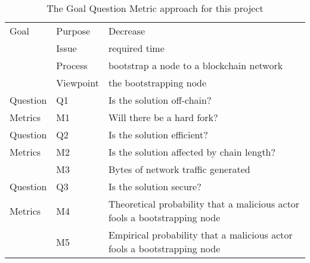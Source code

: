 \begin{center}
\begin{table}[h]
    \begin{tabular}{|ll|l|}
        \hline
        Goal & Purpose    & Decrease \\
             & Issue      & required time \\
             & Process    & bootstrap a node to a blockchain network \\
             & Viewpoint  & the bootstrapping node \\ \hline

        Question & Q1 & Is the solution off-chain? \\ \hline
        Metrics  & M1 & Will there be a hard fork? \\ \hline

        Question & Q2 & Is the solution efficient? \\ \hline
        Metrics  & M2 & Is the solution affected by chain length? \\
                 & M3 & Bytes of network traffic generated \\ \hline

        Question & Q3 & Is the solution secure? \\ \hline
        Metrics  & M4 & Theoretical probability that a malicious actor fools a bootstrapping node \\
                 & M5 & Empirical probability that a malicious actor fools a bootstrapping node \\
        \hline
    \end{tabular}
    \caption{The Goal Question Metric approach for this project}
    \label{tab:gqm}
\end{table}
\end{center}

